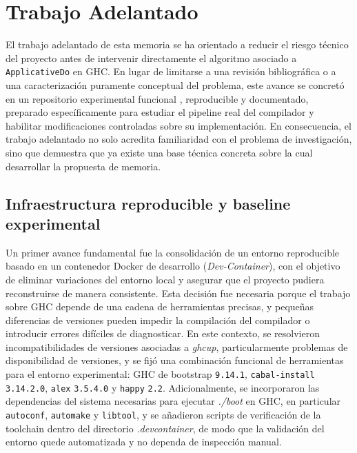 \section{Trabajo Adelantado}\label{sec:trabajo_adelantado}

El trabajo adelantado de esta memoria se ha orientado a reducir el riesgo técnico del proyecto antes de intervenir directamente el algoritmo asociado a \texttt{ApplicativeDo} en \textsf{GHC}. En lugar de limitarse a una revisión bibliográfica o a una caracterización puramente conceptual del problema, este avance se concretó en un repositorio experimental funcional \cite{RomeroApplicativeDoRepo}, reproducible y documentado, preparado específicamente para estudiar el pipeline real del compilador y habilitar modificaciones controladas sobre su implementación. En consecuencia, el trabajo adelantado no solo acredita familiaridad con el problema de investigación, sino que demuestra que ya existe una base técnica concreta sobre la cual desarrollar la propuesta de memoria.

\subsection{Infraestructura reproducible y baseline experimental}

Un primer avance fundamental fue la consolidación de un entorno reproducible basado en un contenedor \textsf{Docker} de desarrollo (\textit{Dev-Container}), con el objetivo de eliminar variaciones del entorno local y asegurar que el proyecto pudiera reconstruirse de manera consistente. Esta decisión fue necesaria porque el trabajo sobre \textsf{GHC} depende de una cadena de herramientas precisas, y pequeñas diferencias de versiones pueden impedir la compilación del compilador o introducir errores difíciles de diagnosticar. En este contexto, se resolvieron incompatibilidades de versiones asociadas a \textit{ghcup}, particularmente problemas de disponibilidad de versiones, y se fijó una combinación funcional de herramientas para el entorno experimental: \textsf{GHC} de bootstrap \texttt{9.14.1}, \texttt{cabal-install} \texttt{3.14.2.0}, \texttt{alex} \texttt{3.5.4.0} y \texttt{happy} \texttt{2.2}. Adicionalmente, se incorporaron las dependencias del sistema necesarias para ejecutar \textit{./boot} en \textsf{GHC}, en particular \texttt{autoconf}, \texttt{automake} y \texttt{libtool}, y se añadieron scripts de verificación de la toolchain dentro del directorio \textit{.devcontainer}, de modo que la validación del entorno quede automatizada y no dependa de inspección manual.

